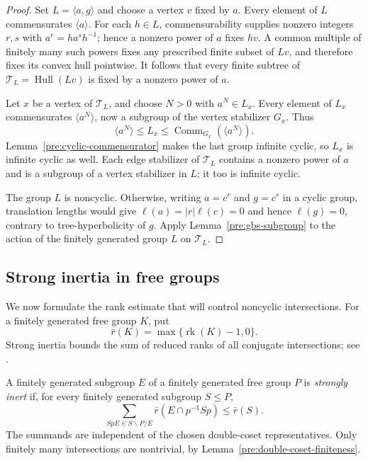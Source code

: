 \begin{proof}
Set \(L=\langle a,g\rangle\) and choose a vertex \(v\) fixed by \(a\).
Every element of \(L\) commensurates \(\langle a\rangle\). For each
\(h\in L\), commensurability supplies nonzero integers \(r,s\) with
\(a^r=ha^sh^{-1}\); hence a nonzero power of \(a\) fixes \(hv\).
A common multiple of finitely many such powers fixes any prescribed
finite subset of \(Lv\), and therefore fixes its convex hull pointwise.
It follows that every finite subtree of
\(\mathcal T_L=\operatorname{Hull}(Lv)\) is fixed by a nonzero power of
\(a\).

Let \(x\) be a vertex of \(\mathcal T_L\), and choose \(N>0\) with
\(a^N\in L_x\). Every element of \(L_x\) commensurates
\(\langle a^N\rangle\), now a subgroup of the vertex stabilizer \(G_x\).
Thus
\[
  \langle a^N\rangle
  \leq L_x
  \leq \operatorname{Comm}_{G_x}(\langle a^N\rangle).
\]
Lemma~\ref{pre:cyclic-commensurator} makes the last group infinite cyclic,
so \(L_x\) is infinite cyclic as well. Each edge stabilizer of
\(\mathcal T_L\) contains a nonzero power of \(a\) and is a subgroup of a
vertex stabilizer in \(L\); it too is infinite cyclic.

The group \(L\) is noncyclic. Otherwise, writing \(a=c^r\) and \(g=c^s\)
in a cyclic group, translation lengths would give
\(\ell(a)=|r|\ell(c)=0\) and hence \(\ell(g)=0\), contrary to
tree-hyperbolicity of \(g\). Apply Lemma~\ref{pre:gbs-subgroup} to the
action of the finitely generated group \(L\) on \(\mathcal T_L\).
\end{proof}

\subsection{Strong inertia in free groups}

We now formulate the rank estimate that will control noncyclic
intersections. For a finitely generated free group \(K\), put
\[
  \bar r(K)=\max\{\operatorname{rk}(K)-1,0\}.
\]
Strong inertia bounds the sum of reduced ranks of all conjugate
intersections; see
\cite{LintonHierarchies2025}.

\begin{definition}
\label{pre:strong-inertia-definition}
A finitely generated subgroup \(E\) of a finitely generated free group
\(P\) is \emph{strongly inert} if, for every finitely generated subgroup
\(S\leq P\),
\begin{equation}
  \sum_{SpE\in S\backslash P/E}
  \bar r(E\cap p^{-1}Sp)\leq\bar r(S).
  \label{pre:strong-inertia-inequality}
\end{equation}
The summands are independent of the chosen double-coset representatives.
Only finitely many intersections are nontrivial, by
Lemma~\ref{pre:double-coset-finiteness}.
\end{definition}

